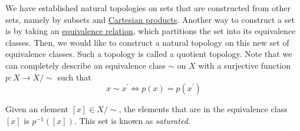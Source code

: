   We have established natural topologies on sets that are constructed from other sets, namely by subsets and \hyperref[st-def:cart-prod-2]{Cartesian products}. Another way to construct a set is by taking an \hyperref[st-def:equivalence_relation]{equivalence relation}, which partitions the set into its equivalence classes. Then, we would like to construct a natural topology on this new set of equivalence classes. Such a topology is called a quotient topology. Note that we can completely describe an equivalence class $\sim$ on $X$ with a surjective function $p: X \to X/\sim$ such that 
	\begin{equation}
	  x \sim x^\prime \iff p(x) = p(x^\prime)
	\end{equation}

	Given an element $[x] \in X/\sim$, the elements that are in the equivalence class $[x]$ is $p^{-1}([x])$. This set is known as \textit{saturated}. 

